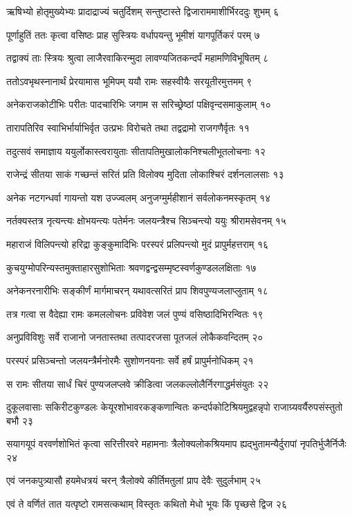 ऋषिभ्यो होतृमुख्येभ्यः प्रादाद्राज्यं चतुर्दिशम्
सन्तुष्टास्ते द्विजाराममाशीर्भिरददुः शुभम् ६

पूर्णाहुतिं ततः कृत्वा वसिष्ठः प्राह सुस्त्रियः
वर्धापयन्तु भूमीशं यागपूर्तिकरं परम् ७

तद्वाक्यं ताः स्त्रियः श्रुत्वा लाजैरवाकिरन्मुदा
लावण्यजितकन्दर्पं महामणिविभूषितम् ८

ततोऽवभृथस्नानार्थं प्रेरयामास भूमिपम्
ययौ रामः सहस्वीयैः सरयूतीरमुत्तमम् ९

अनेकराजकोटीभिः परीतः पादचारिभिः
जगाम स सरिच्छ्रेष्ठां पक्षिवृन्दसमाकुलाम् १०

तारापतिरिव स्वाभिर्भार्याभिर्वृत उत्प्रभः
विरोचते तथा तद्वद्रामो राजगणैर्वृतः ११

तदुत्सवं समाज्ञाय ययुर्लोकास्त्वरायुताः
सीतापतिमुखालोकनिश्चलीभूतलोचनाः १२

राजेन्द्रं सीतया साकं गच्छन्तं सरितं प्रति
विलोक्य मुदिता लोकाश्चिरं दर्शनलालसाः १३

अनेक नटगन्धर्वा गायन्तो यश उज्ज्वलम्
अनुजग्मुर्महीशानं सर्वलोकनमस्कृतम् १४

नर्तक्यस्तत्र नृत्यन्त्यः क्षोभयन्त्यः पतेर्मनः
जलयन्त्रैश्च सिञ्चन्त्यो ययुः श्रीरामसेवनम् १५

महाराजं विलिपन्त्यो हरिद्रा कुङ्कुमादिभिः
परस्परं प्रलिपन्त्यो मुदं प्रापुर्महत्तराम् १६

कुचयुग्मोपरिन्यस्तमुक्ताहारसुशोभिताः
श्रवणद्वन्द्वसम्मृष्टस्वर्णकुण्डललक्षिताः १७

अनेकनरनारीभिः सङ्कीर्णं मार्गमाचरन्
यथावत्सरितं प्राप शिवपुण्यजलाप्लुताम् १८

तत्र गत्वा स वैदेह्या रामः कमललोचनः
प्रविवेश जलं पुण्यं वसिष्ठादिभिरन्वितः १९

अनुप्रविविशुः सर्वे राजानो जनतास्तथा
तत्पादरजसा पूतजलं लोकैकवन्दितम् २०

परस्परं प्रसिञ्चन्तो जलयन्त्रैर्मनोरमैः
सुशोणनयनाः सर्वे हर्षं प्रापुर्मनोधिकम् २१

स रामः सीतया सार्धं चिरं पुण्यजलप्लवे
क्रीडित्वा जलकल्लोलैर्निरगाद्धर्मसंयुतः २२

दुकूलवासाः सकिरीटकुण्डलः केयूरशोभावरकङ्कणान्वितः
कन्दर्पकोटिश्रियमुद्वहन्नृपो राजाग्र्यवर्यैरुपसंस्तुतो बभौ २३

सयागयूपं वरवर्णशोभितं कृत्वा सरित्तीरवरे महामनाः
त्रैलोक्यलोकश्रियमाप ह्यद्भुतामन्यैर्दुरापां नृपतिर्भुजैर्निजैः २४

एवं जनकपुत्र्यासौ हयमेधत्रयं चरन्
त्रैलोक्ये कीर्तिमतुलां प्राप देवैः सुदुर्लभाम् २५

एवं ते वर्णितं तात यत्पृष्टो रामसत्कथाम्
विस्तृतः कथितो मेधो भूयः किं पृच्छसे द्विज २६

